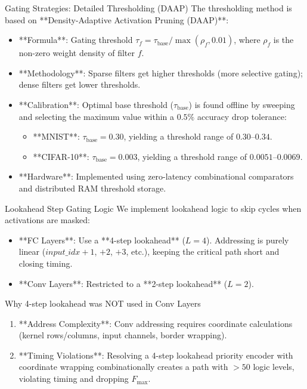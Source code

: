 \documentclass{beamer}
\begin{document}
\begin{frame}{Gating Strategies: Detailed Thresholding (DAAP)}
The thresholding method is based on **Density-Adaptive Activation Pruning (DAAP)**:
\begin{itemize}
    \item **Formula**: Gating threshold $\tau_f = \tau_{\text{base}} / \max(\rho_f, 0.01)$, where $\rho_f$ is the non-zero weight density of filter $f$.
    \item **Methodology**: Sparse filters get higher thresholds (more selective gating); dense filters get lower thresholds.
    \item **Calibration**: Optimal base threshold ($\tau_{\text{base}}$) is found offline by sweeping and selecting the maximum value within a $0.5\%$ accuracy drop tolerance:
    \begin{itemize}
        \item **MNIST**: $\tau_{\text{base}} = 0.30$, yielding a threshold range of $0.30$--$0.34$.
        \item **CIFAR-10**: $\tau_{\text{base}} = 0.003$, yielding a threshold range of $0.0051$--$0.0069$.
    \end{itemize}
    \item **Hardware**: Implemented using zero-latency combinational comparators and distributed RAM threshold storage.
\end{itemize}
\end{frame}

\begin{frame}{Lookahead Step Gating Logic}
We implement lookahead logic to skip cycles when activations are masked:
\begin{itemize}
    \item **FC Layers**: Use a **4-step lookahead** ($L=4$). Addressing is purely linear ($input\_idx + 1$, $+2$, $+3$, etc.), keeping the critical path short and closing timing.
    \item **Conv Layers**: Restricted to a **2-step lookahead** ($L=2$). 
\end{itemize}
\begin{block}{Why 4-step lookahead was NOT used in Conv Layers}
\begin{enumerate}
    \item **Address Complexity**: Conv addressing requires coordinate calculations (kernel rows/columns, input channels, border wrapping).
    \item **Timing Violations**: Resolving a 4-step lookahead priority encoder with coordinate wrapping combinationally creates a path with $>50$ logic levels, violating timing and dropping $F_{\text{max}}$.
\end{enumerate}
\end{block}
\end{frame}
\end{document}
